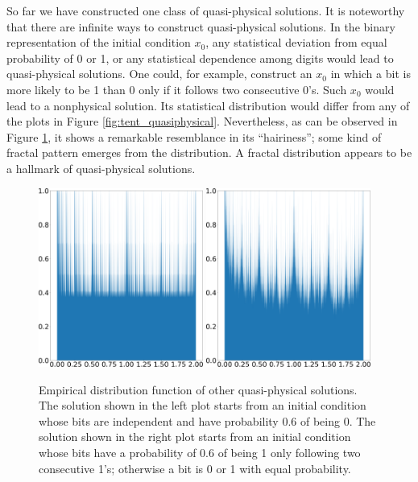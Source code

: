 So far we have constructed one class of quasi-physical solutions.
It is noteworthy that there are infinite ways to 
construct quasi-physical solutions.  In the binary representation 
of the initial condition $x_0$, any statistical
deviation from equal probability of 0 or 1, or any statistical
dependence among digits would lead to quasi-physical solutions.
One could, for example, construct an $x_0$ in which a bit is
more likely to be 1 than 0 only if it follows two consecutive 0's.
Such $x_0$ would lead to a nonphysical solution.  Its statistical
distribution would differ from any of the plots in Figure
\ref{fig:tent_quasiphysical}.  Nevertheless, as can be
observed in Figure \ref{fig:tent_alternative}, it shows
a remarkable resemblance in its ``hairiness''; some kind of fractal
pattern emerges from the distribution.  A fractal distribution
appears to be a hallmark of quasi-physical solutions.
\begin{figure}\centering
    \centering
    \includegraphics[width=0.48\textwidth]{figure/tent_quasiphysical_alternaive1_hist_p_0.6.png}
    \hspace{0.02\textwidth}
    \includegraphics[width=0.48\textwidth]{figure/tent_quasiphysical_alternaive2_hist_p_0.6.png}
    \caption{Empirical distribution function of other quasi-physical solutions.
    The solution shown in the left plot starts from an initial condition
    whose bits are independent and have probability 0.6 of being 0.
    The solution shown in the right plot starts from an initial condition
    whose bits have a probability of 0.6 of being 1 only following two
    consecutive 1's; otherwise a bit is 0 or 1 with equal probability.}
    \label{fig:tent_alternative}
\end{figure}

